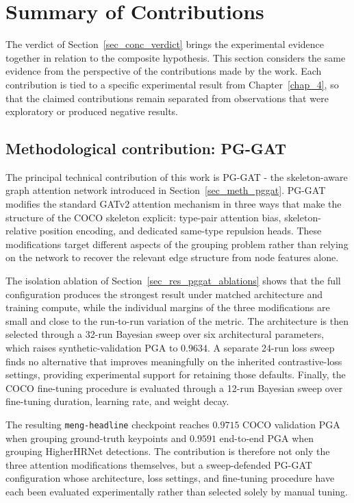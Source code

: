 \section{Summary of Contributions}
\label{sec_conc_contributions}

The verdict of Section~\ref{sec_conc_verdict} brings the experimental
evidence together in relation to the composite hypothesis.
This section considers the same evidence from the perspective of the
contributions made by the work.
Each contribution is tied to a specific experimental result from
Chapter~\ref{chap_4},
so that the claimed contributions remain separated from observations
that were exploratory or produced negative results.

\subsection{Methodological contribution: PG-GAT}
\label{sec_conc_contrib_pggat}

The principal technical contribution of this work is PG-GAT - the
skeleton-aware graph attention network introduced in
Section~\ref{sec_meth_pggat}.
PG-GAT modifies the standard GATv2 attention mechanism in three ways
that make the structure of the COCO skeleton explicit:
type-pair attention bias,
skeleton-relative position encoding,
and dedicated same-type repulsion heads.
These modifications target different aspects of the grouping problem
rather than relying on the network to recover the relevant edge
structure from node features alone.

The isolation ablation of Section~\ref{sec_res_pggat_ablations} shows
that the full configuration produces the strongest result under
matched architecture and training compute,
while the individual margins of the three modifications are small and
close to the run-to-run variation of the metric.
The architecture is then selected through a 32-run Bayesian sweep over
six architectural parameters,
which raises synthetic-validation PGA to $0.9634$.
A separate 24-run loss sweep finds no alternative that improves
meaningfully on the inherited contrastive-loss settings,
providing experimental support for retaining those defaults.
Finally, the COCO fine-tuning procedure is evaluated through a 12-run
Bayesian sweep over fine-tuning duration,
learning rate,
and weight decay.

The resulting \texttt{meng-headline} checkpoint reaches $0.9715$ COCO
validation PGA when grouping ground-truth keypoints and $0.9591$
end-to-end PGA when grouping HigherHRNet detections.
The contribution is therefore not only the three attention modifications
themselves,
but a sweep-defended PG-GAT configuration whose architecture,
loss settings,
and fine-tuning procedure have each been evaluated experimentally
rather than selected solely by manual tuning.

